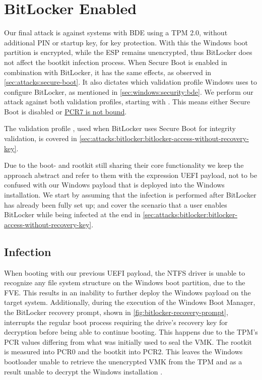 \section{BitLocker Enabled}

Our final attack is against systems with \ac{BDE} using a \ac{TPM} 2.0, without additional \ac{PIN} or startup key, for key protection.
With this the Windows boot partition is encrypted, while the \ac{ESP} remains unencrypted, thus BitLocker does not affect the bootkit infection process.
When Secure Boot is enabled in combination with BitLocker, it has the same effects, as observed in \autoref{sec:attacks:secure-boot}.
It also dictates which validation profile Windows uses to configure BitLocker, as mentioned in \autoref{sec:windows:security:bde}.
We perform our attack against both validation profiles, starting with \hyperref[tab:pcr-usage]{}.
This means either Secure Boot is disabled or \hyperlink{pcr7-binding}{\ac{PCR}7 is not bound}.

The validation profile \hyperref[tab:pcr-usage]{}, used when BitLocker uses Secure Boot for integrity validation, is covered in \autoref{sec:attacks:bitlocker:bitlocker-access-without-recovery-key}.

Due to the boot- and rootkit still sharing their core functionality we keep the approach abstract and refer to them with the expression \ac{UEFI} payload, not to be confused with our Windows payload that is deployed into the Windows installation.
We start by assuming that the infection is performed after BitLocker has already been fully set up; and cover the scenario that a user enables BitLocker while being infected at the end in \autoref{sec:attacks:bitlocker:bitlocker-access-without-recovery-key}.

\subsection{Infection}

When booting with our previous \ac{UEFI} payload, the \ac{NTFS} driver is unable to recognize any file system structure on the Windows boot partition, due to the \ac{FVE}.
This results in an inability to further deploy the Windows payload on the target system.
Additionally, during the execution of the Windows Boot Manager, the BitLocker recovery prompt, shown in \autoref{fig:bitlocker-recovery-prompt}, interrupts the regular boot process requiring the drive's recovery key for decryption before being able to continue booting.
This happens due to the \ac{TPM}'s \ac{PCR} values differing from what was initially used to seal the \ac{VMK}.
The rootkit is measured into \ac{PCR}0 and the bootkit into \ac{PCR}2.
This leaves the Windows bootloader unable to retrieve the unencrypted \ac{VMK} from the \ac{TPM} and as a result unable to decrypt the Windows installation \cite[Section 12]{windows-internals-7-part2}.

